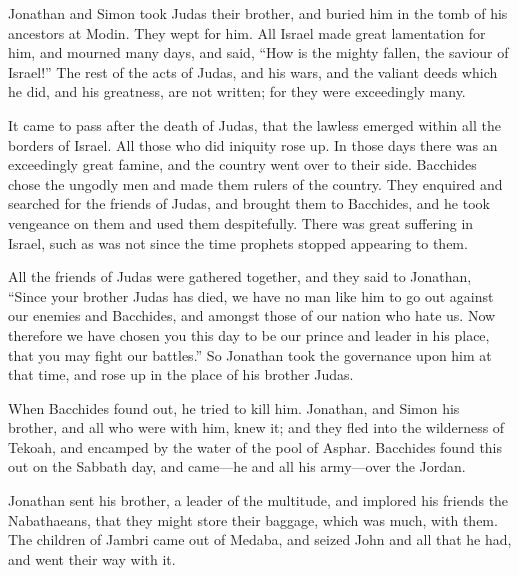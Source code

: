 Jonathan and Simon took Judas their brother, and buried
him in the tomb of his ancestors at Modin.  They wept for
him. All Israel made great lamentation for him, and mourned many days,
and said,  ``How is the mighty fallen, the saviour of
Israel!''  The rest of the acts of Judas, and his wars, and
the valiant deeds which he did, and his greatness, are not written; for
they were exceedingly many.

 It came to pass after the death of Judas, that the lawless
emerged within all the borders of Israel. All those who did iniquity
rose up.  In those days there was an exceedingly great
famine, and the country went over to their side.  Bacchides
chose the ungodly men and made them rulers of the country. 
They enquired and searched for the friends of Judas, and brought them to
Bacchides, and he took vengeance on them and used them despitefully.
 There was great suffering in Israel, such as was not since
the time prophets stopped appearing to them.

 All the friends of Judas were gathered together, and they
said to Jonathan,  ``Since your brother Judas has died, we
have no man like him to go out against our enemies and Bacchides, and
amongst those of our nation who hate us.  Now therefore we
have chosen you this day to be our prince and leader in his place, that
you may fight our battles.''  So Jonathan took the
governance upon him at that time, and rose up in the place of his
brother Judas.

 When Bacchides found out, he tried to kill him.
 Jonathan, and Simon his brother, and all who were with
him, knew it; and they fled into the wilderness of Tekoah, and encamped
by the water of the pool of Asphar.  Bacchides found this
out on the Sabbath day, and came---he and all his army---over the
Jordan.

 Jonathan sent his brother, a leader of the multitude, and
implored his friends the Nabathaeans, that they might store their
baggage, which was much, with them.  The children of Jambri
came out of Medaba, and seized John and all that he had, and went their
way with it.


